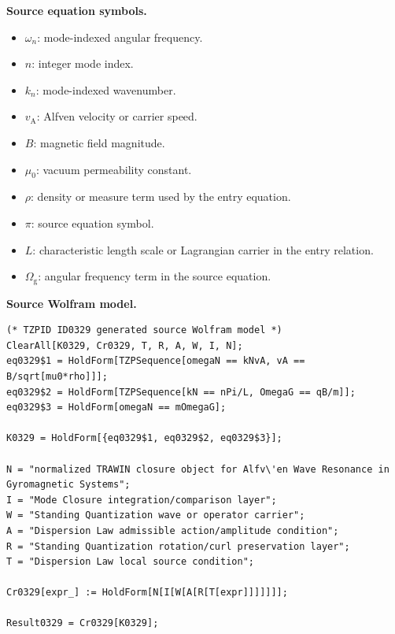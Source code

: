 \begin{minipage}[t]{0.49\linewidth}
\begingroup
\small
\raggedright
\textbf{Source equation symbols.}\par
\begin{itemize}[leftmargin=1.35em,itemsep=1pt,topsep=1pt,parsep=0pt]
    \item $\omega_{n}$: mode-indexed angular frequency.
    \item $n$: integer mode index.
    \item $k_{n}$: mode-indexed wavenumber.
    \item $v_{\mathrm{A}}$: Alfven velocity or carrier speed.
    \item $B$: magnetic field magnitude.
    \item $\mu_{0}$: vacuum permeability constant.
    \item $\rho$: density or measure term used by the entry equation.
    \item $\pi$: source equation symbol.
    \item $L$: characteristic length scale or Lagrangian carrier in the entry relation.
    \item $\Omega_{\mathrm{g}}$: angular frequency term in the source equation.
\end{itemize}
\endgroup
\end{minipage}\hfill
\begin{minipage}[t]{0.47\linewidth}
\begingroup
\scriptsize
\raggedright
\textbf{Source Wolfram model.}\par
\begin{Verbatim}[fontsize=\tiny,breaklines=true,breakanywhere=true]
(* TZPID ID0329 generated source Wolfram model *)
ClearAll[K0329, Cr0329, T, R, A, W, I, N];
eq0329$1 = HoldForm[TZPSequence[omegaN == kNvA, vA == B/sqrt[mu0*rho]]];
eq0329$2 = HoldForm[TZPSequence[kN == nPi/L, OmegaG == qB/m]];
eq0329$3 = HoldForm[omegaN == mOmegaG];

K0329 = HoldForm[{eq0329$1, eq0329$2, eq0329$3}];

N = "normalized TRAWIN closure object for Alfv\'en Wave Resonance in Gyromagnetic Systems";
I = "Mode Closure integration/comparison layer";
W = "Standing Quantization wave or operator carrier";
A = "Dispersion Law admissible action/amplitude condition";
R = "Standing Quantization rotation/curl preservation layer";
T = "Dispersion Law local source condition";

Cr0329[expr_] := HoldForm[N[I[W[A[R[T[expr]]]]]]];

Result0329 = Cr0329[K0329];
\end{Verbatim}
\endgroup
\end{minipage}

